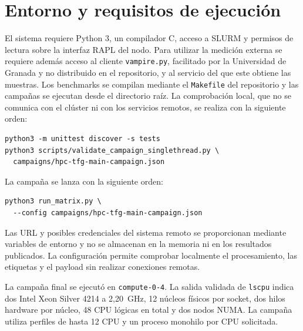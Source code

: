 \chapter{Entorno y requisitos de ejecución}
\label{anexo:entorno}

El sistema requiere Python 3, un compilador C, acceso a SLURM y permisos de lectura sobre la interfaz RAPL del nodo. Para utilizar la medición externa se requiere además acceso al cliente \texttt{vampire.py}, facilitado por la Universidad de Granada y no distribuido en el repositorio, y al servicio del que este obtiene las muestras. Los benchmarks se compilan mediante el \texttt{Makefile} del repositorio y las campañas se ejecutan desde el directorio raíz. La comprobación local, que no se comunica con el clúster ni con los servicios remotos, se realiza con la siguiente orden:

\begin{lstlisting}[style=Consola]
python3 -m unittest discover -s tests
python3 scripts/validate_campaign_singlethread.py \
  campaigns/hpc-tfg-main-campaign.json
\end{lstlisting}

La campaña se lanza con la siguiente orden:

\begin{lstlisting}[style=Consola]
python3 run_matrix.py \
  --config campaigns/hpc-tfg-main-campaign.json
\end{lstlisting}

Las URL y posibles credenciales del sistema remoto se proporcionan mediante variables de entorno y no se almacenan en la memoria ni en los resultados publicados. La configuración permite comprobar localmente el procesamiento, las etiquetas y el payload sin realizar conexiones remotas.

La campaña final se ejecutó en \texttt{compute-0-4}. La salida validada de \texttt{lscpu} indica dos Intel Xeon Silver 4214 a 2,20~GHz, 12 núcleos físicos por socket, dos hilos hardware por núcleo, 48 CPU lógicas en total y dos nodos NUMA. La campaña utiliza perfiles de hasta 12 CPU y un proceso monohilo por CPU solicitada.
